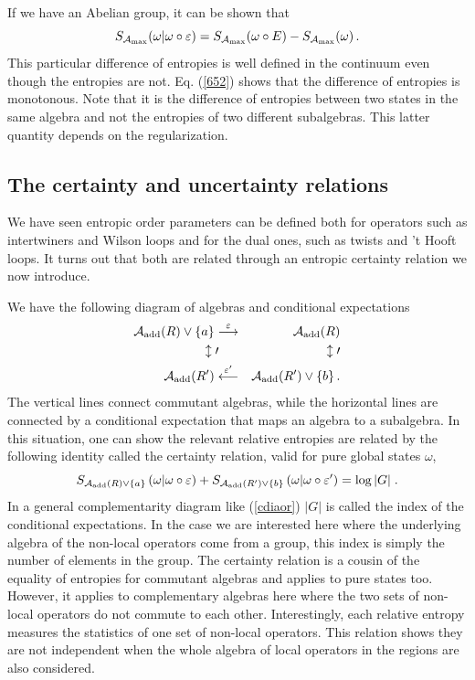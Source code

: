 \documentclass[11pt]{article}
\numberwithin{equation}{section}
\newcommand\eea{\end{eqnarray}}
\newcommand\bea{\begin{eqnarray}}
\newcommand{\be}{\begin{equation}}
\newcommand{\ee}{\end{equation}}
\begin{document}
If we have an Abelian group, it can be shown that 
\be
S_{{\cal A}_{\textrm{max}}}(\omega|\omega \circ \varepsilon)=S_{{\cal A}_{\textrm{max}}}(\omega\circ E)-S_{{\cal A}_{\textrm{max}}}(\omega)\,.\label{652}
\ee
This particular difference of entropies is well defined in the continuum even though the entropies are not. Eq. (\ref{652}) shows that the difference of entropies is monotonous. Note that it is the difference of entropies between two states in the same algebra and not the entropies of two different subalgebras. This latter quantity depends on the regularization. 
 
\subsection{The certainty and uncertainty relations}

We have seen entropic order parameters can be defined both for operators such as intertwiners and Wilson loops and for the dual ones, such as twists and 't Hooft loops. It turns out that both are related through an entropic certainty relation we now introduce.  

We have the following diagram of algebras and conditional expectations
\bea\label{cdiaor}
{\cal A}_{\textrm{add}}(R)\vee \{a\} & \overset{\varepsilon}{\longrightarrow} &{\cal A}_{\textrm{add}}(R)\nonumber \\
\updownarrow\prime \!\! &  & \,\updownarrow\prime\\
{\cal A}_{\textrm{add}}(R')& \overset{\varepsilon'}{\longleftarrow} & {\cal A}_{\textrm{add}}(R')\vee \{b\}\,.\nonumber 
\eea
The vertical lines connect commutant algebras, while the horizontal lines are connected by a conditional expectation that maps an algebra to a subalgebra. In this situation, one can show the relevant relative entropies are related by the following identity called the certainty relation, valid for pure global states $\omega$,  
\be
S_{{\cal A}_{\textrm{add}}(R)\vee \{a\}}\left(\omega|\omega\circ\varepsilon\right)+S_{{\cal A}_{\textrm{add}}(R')\vee \{b\}}\left(\omega|\omega\circ\varepsilon'\right)=\log |G|\;.\label{ede}
\ee
In a general complementarity diagram like (\ref{cdiaor}) $|G|$ is called the index of the conditional expectations. In the case we are interested here where the underlying algebra of the non-local operators come from a group, this index is simply the number of elements in the group.  
The certainty relation is a cousin of the equality of entropies for commutant algebras and applies to pure states too. However, it applies to complementary algebras here where the two sets of non-local operators do not commute to each other.   Interestingly, each relative entropy measures the statistics of one set of non-local operators. This relation shows they are not independent when the whole algebra of local operators in the regions are also considered.   
\end{document}
